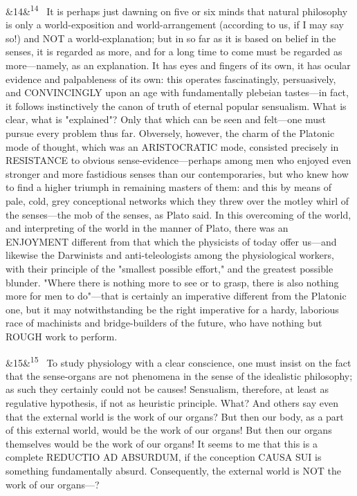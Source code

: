 \documentclass[12pt]{article}
\newcommand{\para}[1][]{\par\noindent\ifx&#1&\else\textsuperscript{\footnotesize #1}~\fi}
\begin{document}
\para[14] It is perhaps just dawning on five or six minds that natural philosophy is only a world-exposition and world-arrangement (according to us, if I may say so!) and NOT a world-explanation; but in so far as it is based on belief in the senses, it is regarded as more, and for a long time to come must be regarded as more---namely, as an explanation. It has eyes and fingers of its own, it has ocular evidence and palpableness of its own: this operates fascinatingly, persuasively, and CONVINCINGLY upon an age with fundamentally plebeian tastes---in fact, it follows instinctively the canon of truth of eternal popular sensualism. What is clear, what is "explained"? Only that which can be seen and felt---one must pursue every problem thus far. Obversely, however, the charm of the Platonic mode of thought, which was an ARISTOCRATIC mode, consisted precisely in RESISTANCE to obvious sense-evidence---perhaps among men who enjoyed even stronger and more fastidious senses than our contemporaries, but who knew how to find a higher triumph in remaining masters of them: and this by means of pale, cold, grey conceptional networks which they threw over the motley whirl of the senses---the mob of the senses, as Plato said. In this overcoming of the world, and interpreting of the world in the manner of Plato, there was an ENJOYMENT different from that which the physicists of today offer us---and likewise the Darwinists and anti-teleologists among the physiological workers, with their principle of the "smallest possible effort," and the greatest possible blunder. "Where there is nothing more to see or to grasp, there is also nothing more for men to do"---that is certainly an imperative different from the Platonic one, but it may notwithstanding be the right imperative for a hardy, laborious race of machinists and bridge-builders of the future, who have nothing but ROUGH work to perform.

\para[15] To study physiology with a clear conscience, one must insist on the fact that the sense-organs are not phenomena in the sense of the idealistic philosophy; as such they certainly could not be causes! Sensualism, therefore, at least as regulative hypothesis, if not as heuristic principle. What? And others say even that the external world is the work of our organs? But then our body, as a part of this external world, would be the work of our organs! But then our organs themselves would be the work of our organs! It seems to me that this is a complete REDUCTIO AD ABSURDUM, if the conception CAUSA SUI is something fundamentally absurd. Consequently, the external world is NOT the work of our organs---?
\end{document}
